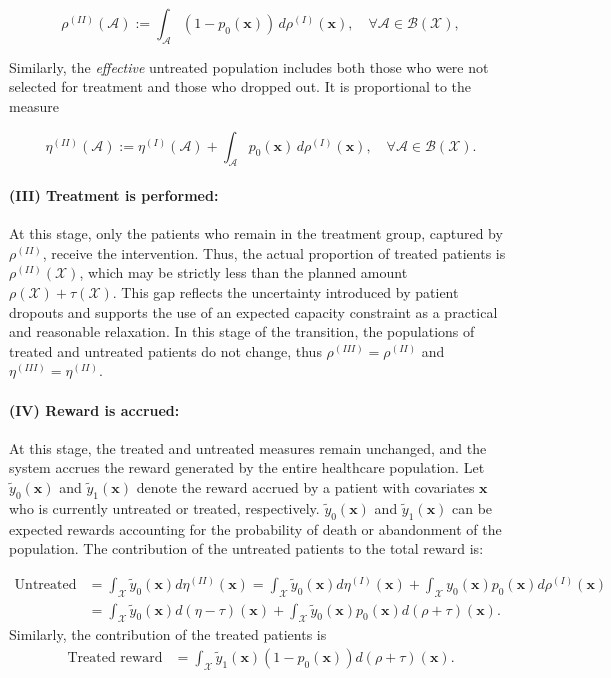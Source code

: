 \documentclass[12pt,a4paper]{article}
\newcommand{\bx}{\mathbf{x}}
\newcommand{\mX}{\mathcal{X}}
\begin{document}
$$
\rho^{(II)}(\mathcal{A}) := \int_{\mathcal{A}} (1 - p_0(\bx)) \, d\rho^{(I)}(\bx), \quad \forall \mathcal{A} \in \mathcal{B}(\mathcal{X}),
$$

\noindent 
Similarly, the {\it effective} untreated population includes both those who were not selected for treatment and those who dropped out. It is proportional to the measure

$$
\eta^{(II)}(\mathcal{A}) := \eta^{(I)}(\mathcal{A})  + \int_{\mathcal{A}} p_0(\bx) \, d\rho^{(I)}(\bx), \quad \forall \mathcal{A} \in \mathcal{B}(\mathcal{X}).
$$




\paragraph{\bf (III) Treatment is performed:} At this stage, only the patients who remain in the treatment group, captured by $\rho^{(II)}$, receive the intervention. Thus, the actual proportion of treated patients is $\rho^{(II)}(\mathcal{X})$, which may be strictly less than the planned amount $\rho(\mathcal{X}) + \tau(\mathcal{X})$. This gap reflects the uncertainty introduced by patient dropouts and supports the use of an expected capacity constraint as a practical and reasonable relaxation. In this stage of the transition, the populations of treated and untreated patients do not change, thus $\rho^{(III)}=\rho^{(II)}$ and $\eta^{(III)}=\eta^{(II)}$.

\paragraph{\bf (IV) Reward is accrued:} At this stage, the treated and untreated measures remain unchanged, and the system accrues the reward generated by the entire healthcare population. Let $\tilde{y}_0(\bx)$ and $\tilde{y}_1(\bx)$ denote the reward accrued by a patient with covariates $\bx$ who is currently untreated or treated, respectively. $\tilde{y}_0(\bx)$ and $\tilde{y}_1(\bx)$ can be expected rewards accounting for the probability of death or abandonment of the population. The contribution of the untreated patients to the total reward is:


\begin{align}
\mbox{Untreated reward}&=\int_{\mX} \tilde{y}_0(\bx) d\eta^{(II)}(\bx)=\int_{\mX} \tilde{y}_0(\bx) d\eta^{(I)}(\bx)+\int_{\mX} y_0(\bx) p_0(\bx) d\rho^{(I)}(\bx) \nonumber\\
&=\int_{\mX} \tilde{y}_0(\bx) d(\eta-\tau)(\bx)+\int_{\mX} \tilde{y}_0(\bx) p_0(\bx) d(\rho+\tau)(\bx). \label{untreated_reward}
\end{align}
%
Similarly, the contribution of the treated patients is
\begin{align}
\mbox{Treated reward}&=\int_{\mX} \tilde{y}_1(\bx) (1-p_0(\bx)) d(\rho+\tau)(\bx). \label{treated_reward}
\end{align}
\end{document}
